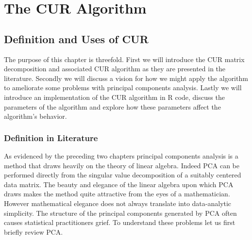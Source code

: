 \documentclass{book}
\begin{document}











\chapter{The CUR Algorithm}

\section{Definition and Uses of CUR}

The purpose of this chapter is threefold. First we will introduce the CUR matrix decomposition and associated CUR algorithm as they are presented in the literature. Secondly we will discuss a vision for how we might apply the algorithm to ameliorate some problems with principal components analysis. Lastly we will introduce an implementation of the CUR algorithm in R code, discuss the parameters of the algorithm and explore how these parameters affect the algorithm's behavior.

\subsection{Definition in Literature}

As evidenced by the preceding two chapters principal components analysis is a method that draws heavily on the theory of linear algebra. Indeed PCA can be performed directly from the singular value decomposition of a suitably centered data matrix. The beauty and elegance of the linear algebra upon which PCA draws makes the method quite attractive from the eyes of a mathematician. However mathematical elegance does not always translate into data-analytic simplicity. The structure of the principal components generated by PCA often causes statistical practitioners grief. To understand these problems let us first briefly review PCA. 
\end{document}

